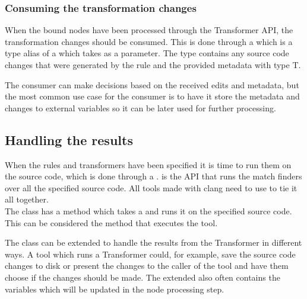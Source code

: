 \subsubsection*{Consuming the transformation changes} \label{subsubsec:080dev:Consumers}

When the bound nodes have been processed through the Transformer API, the transformation changes should be consumed. This is done through a  which is a type alias of a  which takes  as a parameter. The  type contains any source code changes that were generated by the rule and the provided metadata with type T.

The consumer can make decisions based on the received edits and metadata, but the most common use case for the consumer is to have it store the metadata and changes to external variables so it can be later used for further processing.

\subsection{Handling the results} \label{subsec:080dev:HandlingToolResults}
When the rules and transformers have been specified it is time to run them on the source code, which is done through a .  is the API that runs the match finders over all the specified source code.
All tools made with clang need to use  to tie it all together.\\
The  class has a  method which takes a  and runs it on the specified source code.
This can be considered the method that executes the tool.

The  class can be extended to handle the results from the Transformer in different ways. A tool which runs a Transformer could, for example, save the source code changes to disk or present the changes to the caller of the tool and have them choose if the changes should be made. The extended  also often contains the variables which will be updated in the node processing step.